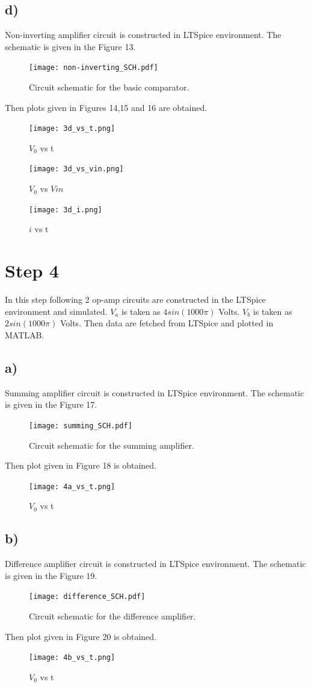 \documentclass[letterpaper,12pt]{article}
\begin{document}
\subsection{d)}
Non-inverting amplifier circuit is constructed in LTSpice environment. The schematic is given in the Figure 13.
\begin{figure}[H]
	\centering
   \texttt{[image: non-inverting\_SCH.pdf]}
   \caption{Circuit schematic for the basic comparator.}
\end{figure} 
Then plots given in Figures 14,15 and 16 are obtained.
\begin{figure}[H]
	\centering
   \texttt{[image: 3d\_vs\_t.png]}
   \caption{\(V_0\) vs t}
\end{figure}

\begin{figure}[H]
	\centering
   \texttt{[image: 3d\_vs\_vin.png]}
   \caption{\(V_0\) vs \(V{in}\)}
\end{figure}

\begin{figure}[H]
	\centering
   \texttt{[image: 3d\_i.png]}
   \caption{\(i\) vs t}
\end{figure}

\section{Step 4}
In this step following 2 op-amp circuits are constructed in the LTSpice environment and simulated. \(V_{a}\) is taken as \(4sin(1000\pi)\) Volts. \(V_{b}\) is taken as \(2sin(1000\pi)\) Volts. Then data are fetched from LTSpice and plotted in MATLAB.

\subsection{a)}
Summing amplifier circuit is constructed in LTSpice environment. The schematic is given in the Figure 17.
\begin{figure}[H]
	\centering
   \texttt{[image: summing\_SCH.pdf]}
   \caption{Circuit schematic for the summing amplifier.}
\end{figure} 
Then plot given in Figure 18 is obtained.
\begin{figure}[H]
	\centering
   \texttt{[image: 4a\_vs\_t.png]}
   \caption{\(V_0\) vs t}
\end{figure}


\subsection{b)}
Difference amplifier circuit is constructed in LTSpice environment. The schematic is given in the Figure 19.
\begin{figure}[H]
	\centering
   \texttt{[image: difference\_SCH.pdf]}
   \caption{Circuit schematic for the difference amplifier.}
\end{figure} 
Then plot given in Figure 20 is obtained.
\begin{figure}[H]
	\centering
   \texttt{[image: 4b\_vs\_t.png]}
   \caption{\(V_0\) vs t}
\end{figure}
\end{document}
